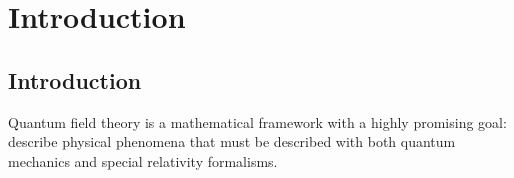 \part{Introduction}

\chapter{Introduction}

    Quantum field theory is a mathematical framework with a highly promising goal: describe physical phenomena that must be described with both quantum mechanics and special relativity formalisms. 
    